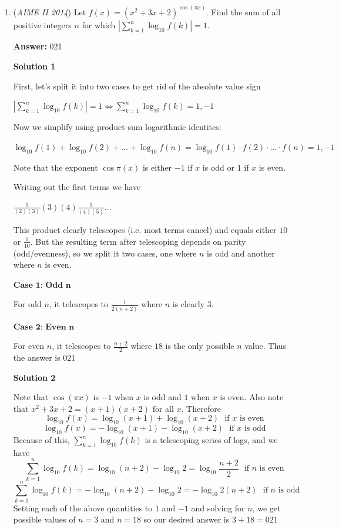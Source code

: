 \begin{enumerate}
	\item (\textit{AIME II 2014}) Let $f(x)=(x^2+3x+2)^{\cos(\pi x)}$. Find the sum of all positive integers $n$ for which 
$\left |\sum_{k=1}^n\log_{10}f(k)\right|=1.$

 \textbf{Answer: }021



\textbf{Solution 1}

First, let's split it into two cases to get rid of the absolute value sign

 $\left |\sum_{k=1}^n\log_{10}f(k)\right|=1 \iff \sum_{k=1}^n\log_{10}f(k)=1,-1$

 Now we simplify using product-sum logarithmic identites:

 $\log_{10}{f(1)}+\log_{10}{f(2)}+...+\log_{10}{f(n)}=\log_{10}{f(1)\cdot f(2) \cdot ... \cdot f(n)}=1,-1$

 


 Note that the exponent $\cos{\pi(x)}$ is either $-1$ if $x$ is odd or $1$ if $x$ is even. 

 Writing out the first terms we have 

 $\frac{1}{(2)(3)}(3)(4)\frac{1}{(4)(5)} \ldots$

 This product clearly telescopes (i.e. most terms cancel) and equals either $10$ or $\frac{1}{10}$. But the resulting term after telescoping depends on parity (odd/evenness), so we split it two cases, one where $n$ is odd and another where $n$ is even. 

 $\textbf{Case 1: Odd n}$

 For odd $n$, it telescopes to $\frac{1}{2(n+2)}$ where $n$ is clearly $3$. 

 $\textbf{Case 2: Even n}$

 For even $n$, it telescopes to $\frac{n+2}{2}$ where $18$ is the only possible $n$ value. Thus the answer is $\boxed{021}$




\textbf{Solution 2}

Note that $\cos(\pi x)$ is $-1$ when $x$ is odd and $1$ when $x$ is even.  Also note that $x^2+3x+2=(x+1)(x+2)$ for all $x$.  Therefore
 \[\log_{10}f(x)=\log_{10}(x+1)+\log_{10}(x+2)\ \ \ \text{if }x \text{ is even}\]
 \[\log_{10}f(x)=-\log_{10}(x+1)-\log_{10}(x+2)\ \ \ \text{if }x \text{ is odd}\]Because of this, $\sum_{k=1}^n\log_{10}f(k)$ is a telescoping series of logs, and we have
 \[\sum_{k=1}^n\log_{10}f(k)= \log_{10}(n+2)-\log_{10}2=\log_{10}\frac{n+2}{2}\ \ \ \text{if }n \text{ is even}\]
 \[\sum_{k=1}^n\log_{10}f(k)= -\log_{10}(n+2)-\log_{10}2=-\log_{10}2(n+2)\ \ \ \text{if }n \text{ is odd}\]Setting each of the above quantities to $1$ and $-1$ and solving for $n$, we get possible values of $n=3$ and $n=18$ so our desired answer is $3+18=\boxed{021}$




\end{enumerate}
